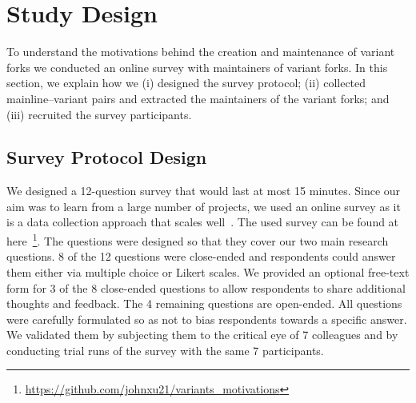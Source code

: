 \section{Study Design}
\label{sec:study_design}

To understand the motivations behind the creation and maintenance of variant forks we conducted an online survey with maintainers of variant forks. In this section, we explain how we (i) designed the survey protocol; (ii) collected mainline--variant pairs and extracted the maintainers of the variant forks; and (iii) recruited the survey participants.


\subsection{Survey Protocol Design}
\label{sec:protocal}

We designed a 12-question survey that would last at most 15 minutes.
Since our aim was to learn from a large number of projects, we used an online survey as it is a data collection approach that scales well~\cite{Flick:2014}.
The used survey can be found at here~\footnote{\url{https://github.com/johnxu21/variants_motivations}}.
The questions were designed so that they cover our two main research questions.
8 of the 12 questions were close-ended and respondents could answer them either via multiple choice or Likert scales.
We provided an optional free-text form for 3 of the 8 close-ended questions to allow respondents to share additional thoughts and feedback.
The 4 remaining questions are open-ended.
All questions were carefully formulated so as not to bias respondents towards a specific answer. We validated them by subjecting them to the critical eye of 7 colleagues and by conducting trial runs of the survey with the same 7 participants.%

